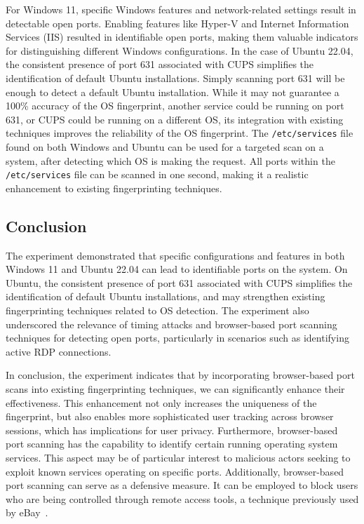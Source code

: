 For Windows 11, specific Windows features and network-related settings result in detectable open ports. Enabling features like Hyper-V and Internet Information Services (IIS) resulted in identifiable open ports, making them valuable indicators for distinguishing different Windows configurations. 
In the case of Ubuntu 22.04, the consistent presence of port 631 associated with CUPS simplifies the identification of default Ubuntu installations. 
Simply scanning port 631 will be enough to detect a default Ubuntu installation. While it may not guarantee a 100\% accuracy of the OS fingerprint, another service could be running on port 631, or CUPS could be running on a different OS, its integration with existing techniques improves the reliability of the OS fingerprint. 
The \texttt{/etc/services} file found on both Windows and Ubuntu can be used for a targeted scan on a system, after detecting which OS is making the request. All ports within the \texttt{/etc/services} file can be scanned in one second, making it a realistic enhancement to existing fingerprinting techniques.  

\subsection{Conclusion}

The experiment demonstrated that specific configurations and features in both Windows 11 and Ubuntu 22.04 can lead to identifiable ports on the system.
On Ubuntu, the consistent presence of port 631 associated with CUPS simplifies the identification of default Ubuntu installations, and may strengthen existing fingerprinting techniques related to OS detection.
The experiment also underscored the relevance of timing attacks and browser-based port scanning techniques for detecting open ports, particularly in scenarios such as identifying active RDP connections.

In conclusion, the experiment indicates that by incorporating browser-based port scans into existing fingerprinting techniques, we can significantly enhance their effectiveness. This enhancement not only increases the uniqueness of the fingerprint, but also enables more sophisticated user tracking across browser sessions, which has implications for user privacy.
Furthermore, browser-based port scanning has the capability to identify certain running operating system services. This aspect may be of particular interest to malicious actors seeking to exploit known services operating on specific ports.
Additionally, browser-based port scanning can serve as a defensive measure. It can be employed to block users who are being controlled through remote access tools, a technique previously used by eBay~\cite{ebay_port_scans}.



